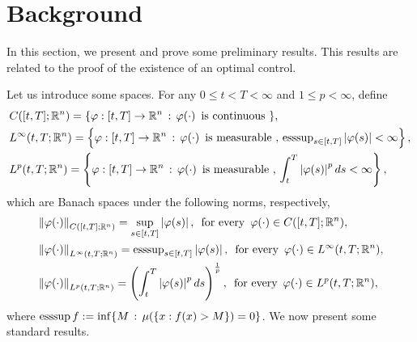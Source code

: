 \section{Background}
    In this section, we present and prove some preliminary results. This results are 
    related to the proof of the existence of an optimal control. 

    Let us introduce some spaces. For any $0\leq t< T<\infty$ and $1\leq p <\infty$, define
    \begin{align*}
        &C([t,T];\mathbb{R}^n) = %
            \{\varphi:[t,T]\to \mathbb{R}^n \, : \, \varphi(\cdot)\, %
            \mbox{ is continuous }\}, \\
        &L^{\infty}(t,T;\mathbb{R}^n) = %
            \left\{\varphi:[t,T]\to \mathbb{R}^n \, : \, \varphi(\cdot)\, %
            \mbox{ is measurable },\, \displaystyle \esssup_{s\in[t,T]} %
            \abs{\varphi(s)} < \infty \right\}, \\
        &L^{p}(t,T;\mathbb{R}^n) = %
            \left\{\varphi:[t,T]\to \mathbb{R}^n \, : \, \varphi(\cdot)\, %
            \mbox{ is measurable },\, \int_{t}^{T}\abs{\varphi(s)}^p ds<\infty \right\},
    \end{align*}
    which are Banach spaces under the following norms, respectively, 
    \begin{align*}
        &\norm{\varphi(\cdot)}_{C([t,T];\mathbb{R}^n)} = %
            \sup_{s\in[t,T]} \abs{\varphi(s)},\, \mbox{ for every }\, \varphi(\cdot) %
            \in C([t,T];\mathbb{R}^n), \\
        &\norm{\varphi(\cdot)}_{L^{\infty}(t,T;\mathbb{R}^n)} = %
            \esssup_{s\in[t,T]} \abs{\varphi(s)}, \, \mbox{ for every }\, %
            \varphi(\cdot) \in L^{\infty}(t,T;\mathbb{R}^n), \\
        &\norm{\varphi(\cdot)}_{L^{p}(t,T;\mathbb{R}^n)} = %
            \left( \int_{t}^{T}\abs{\varphi(s)}^p ds \right)^\frac{1}{p}, \, %
            \mbox{ for every }\, %
            \varphi(\cdot) \in L^{p}(t,T;\mathbb{R}^n),
    \end{align*}
    where $\operatorname{esssup} f:=\inf\{M \, : \, \mu(\{x: f(x)>M\})=0\}$. We now present some 
    standard results.
